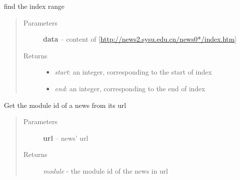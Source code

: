 \documentclass[letterpaper,10pt,english]{sphinxmanual}
\begin{document}
\begin{fulllineitems}
\label{sysunews:sysunews.html_extracting.find_index_range}
find the index range
\begin{quote}\begin{description}
\item[{Parameters}] \leavevmode
\textbf{data} -- content of {[}\href{http://news2.sysu.edu.cn/news0*/index.htm}{http://news2.sysu.edu.cn/news0*/index.htm}{]}

\item[{Returns}] \leavevmode
\begin{itemize}
\item {} 
\emph{start}: an integer, corresponding to the start of index

\item {} 
\emph{end}: an integer, corresponding to the end of index

\end{itemize}


\end{description}\end{quote}

\end{fulllineitems}


\begin{fulllineitems}
\label{sysunews:sysunews.html_extracting.find_module}
Get the module id of a news from its url
\begin{quote}\begin{description}
\item[{Parameters}] \leavevmode
\textbf{url} -- news' url

\item[{Returns}] \leavevmode
\emph{module} - the module id of the news in url

\end{description}\end{quote}

\end{fulllineitems}

\end{document}
